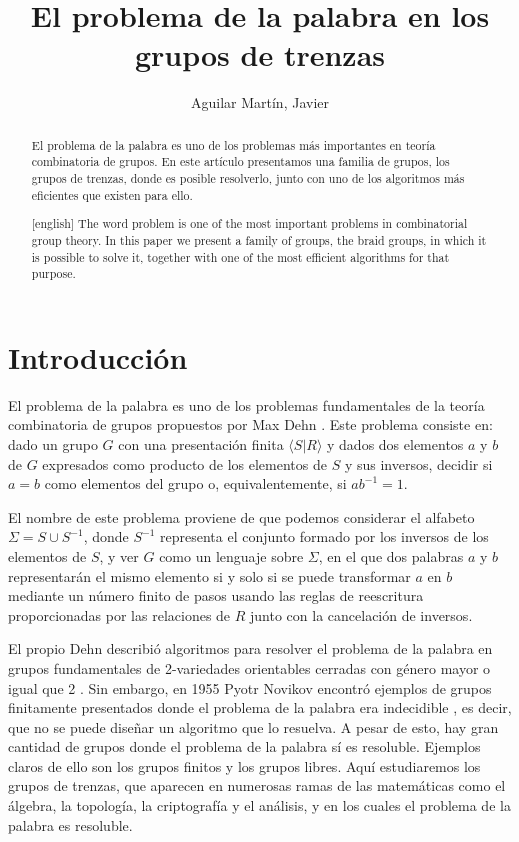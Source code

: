 \documentclass[bibtex, anon]{TEMat-article}
\title[]{El problema de la palabra en los grupos de trenzas}
\author*{Aguilar Martín, Javier}
\affiliation{Universidad de Sevilla (US)}
\begin{document}
\begin{abstract}
El problema de la palabra es uno de los problemas más importantes en teoría combinatoria de grupos. En este artículo presentamos una familia de grupos, los grupos de trenzas, donde es posible resolverlo, junto con uno de los algoritmos más eficientes que existen para ello. 
\end{abstract}
\begin{abstract}[english]
The word problem is one of the most important problems in combinatorial group theory. In this paper we present a family of groups, the braid groups, in which it is possible to solve it, together with one of the most efficient algorithms for that purpose.
\end{abstract}
\maketitle

\section{Introducción}


El problema de la palabra es uno de los problemas fundamentales de la teoría combinatoria de grupos propuestos por Max Dehn \cite{Dehn11}. Este problema consiste en: dado un grupo $G$ con una presentación finita $\langle S| R\rangle$ y dados dos elementos $a$ y $b$ de $G$ expresados como producto de los elementos de $S$ y sus inversos, decidir si $a=b$ como elementos del grupo o, equivalentemente, si $ab^{-1}=1$.

El nombre de este problema proviene de que podemos considerar el alfabeto $\Sigma=S\cup S^{-1}$, donde $S^{-1}$ representa el conjunto formado por los inversos de los elementos de $S$, y ver $G$ como un lenguaje sobre $\Sigma$, en el que dos palabras $a$ y $b$ representarán el mismo elemento si y solo si se puede transformar $a$ en $b$ mediante un número finito de pasos usando las reglas de reescritura proporcionadas por las relaciones de $R$ junto con la cancelación de inversos.  

El propio Dehn describió algoritmos para resolver el problema de la palabra en grupos fundamentales de 2-variedades orientables cerradas con género mayor o igual que 2 \cite{Dehn12}. Sin embargo, en 1955 Pyotr Novikov encontró ejemplos de grupos finitamente presentados donde el problema de la palabra era indecidible \cite{Novikov}, es decir, que no se puede diseñar un algoritmo que lo resuelva. A pesar de esto, hay gran cantidad de grupos donde el problema de la palabra sí es resoluble. Ejemplos claros de ello son los grupos finitos y los grupos libres. Aquí estudiaremos los grupos de trenzas, que aparecen en numerosas ramas de las matemáticas como el álgebra, la topología, la criptografía y el análisis, y en los cuales el problema de la palabra es resoluble.
\end{document}
